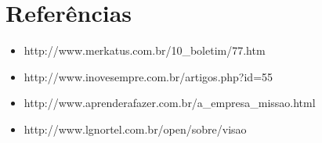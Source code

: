 \documentclass[12pt,a4paper]{article}
\newenvironment{separador}{
\begin{itemize}
  \setlength{\itemsep}{1pt}
  \setlength{\parskip}{0pt}
  \setlength{\parsep}{15pt}
}{\end{itemize}}
\begin{document}
\section{Referências}

\begin{separador}

	\item http://www.merkatus.com.br/10\_boletim/77.htm
	
	\item http://www.inovesempre.com.br/artigos.php?id=55
	
	\item http://www.aprenderafazer.com.br/a\_empresa\_missao.html
	
	\item http://www.lgnortel.com.br/open/sobre/visao
\end{separador}
\end{document}
